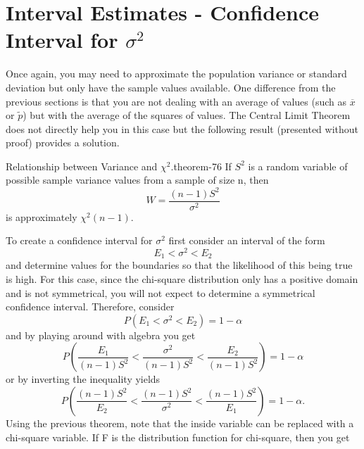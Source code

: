 \documentclass[10pt,]{book}
\numberwithin{equation}{section}
\newcommand{\lt}{<}
\begin{document}
\section[{Interval Estimates - Confidence Interval for \(\sigma^2\)}]{Interval Estimates - Confidence Interval for \(\sigma^2\)}\label{section-70}
\hypertarget{p-1399}{}%
Once again, you may need to approximate the population variance or standard deviation but only have the sample values available. One difference from the previous sections is that you are not dealing with an average of values (such as \(\overline{x}\) or \(\tilde{p}\)) but with the average of the squares of values. The Central Limit Theorem does not directly help you in this case but the following result (presented without proof) provides a solution.%
\begin{theorem}{Relationship between Variance and \(\chi ^2\).}{}{theorem-76}%
\hypertarget{p-1400}{}%
If \(S^2\) is a random variable of possible sample variance values from a sample of size n, then%
\begin{equation*}
W = \frac{(n-1)S^2}{\sigma^2}
\end{equation*}
is approximately \(\chi ^2(n-1).\)%
\end{theorem}
\hypertarget{p-1401}{}%
To create a confidence interval for \(\sigma^2\) first consider an interval of the form%
\begin{equation*}
E_1 \lt \sigma^2 \lt E_2
\end{equation*}
and determine values for the boundaries so that the likelihood of this being true is high. For this case, since the chi-square distribution only has a positive domain and is not symmetrical, you will not expect to determine a symmetrical confidence interval.  Therefore, consider%
\begin{equation*}
P (E_1 \lt \sigma^2 \lt E_2 ) = 1 - \alpha 
\end{equation*}
and by playing around with algebra you get%
\begin{equation*}
P \left ( \frac{E_1}{(n-1)S^2} \lt \frac{\sigma^2}{(n-1)S^2} \lt \frac{E_2}{(n-1)S^2} \right ) = 1 - \alpha 
\end{equation*}
or by inverting the inequality yields%
\begin{equation*}
P \left ( \frac{(n-1)S^2}{E_2} \lt \frac{(n-1)S^2}{\sigma^2} \lt \frac{(n-1)S^2}{E_1} \right ) = 1 - \alpha .
\end{equation*}
Using the previous theorem, note that the inside variable can be replaced with a chi-square variable. If F is the distribution function for chi-square, then you get%
\end{document}
